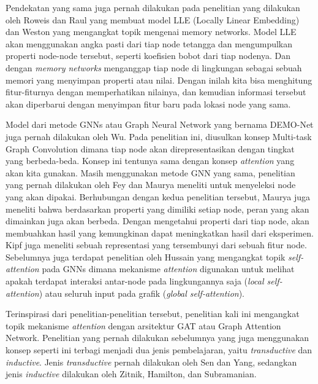 \documentclass{article}
\begin{document}
Pendekatan yang sama juga pernah dilakukan pada penelitian yang dilakukan oleh Roweis dan Raul\cite{cite12} yang membuat model LLE (Locally Linear Embedding) dan Weston\cite{cite13} yang mengangkat topik mengenai memory networks. Model LLE akan menggunakan angka pasti dari tiap node tetangga dan mengumpulkan properti node-node tersebut, seperti koefisien bobot dari tiap nodenya. Dan dengan \textit{memory networks} menganggap tiap node di lingkungan sebagai sebuah memori yang menyimpan properti atau nilai. Dengan inilah kita bisa menghitung fitur-fiturnya dengan memperhatikan nilainya, dan kemudian informasi tersebut akan diperbarui dengan menyimpan fitur baru pada lokasi node yang sama.

Model dari metode GNNs atau Graph Neural Network yang bernama DEMO-Net juga pernah dilakukan oleh Wu\cite{cite14}. Pada penelitian ini, diusulkan konsep Multi-task Graph Convolution dimana tiap node akan direpresentasikan dengan tingkat yang berbeda-beda. Konsep ini tentunya sama dengan konsep \textit{attention} yang akan kita gunakan. Masih menggunakan metode GNN yang sama, penelitian yang pernah dilakukan oleh Fey\cite{cite15} dan Maurya\cite{cite16} meneliti untuk menyeleksi node yang akan dipakai. Berhubungan dengan kedua penelitian tersebut, Maurya\cite{cite17} juga meneliti bahwa berdasarkan properti yang dimiliki setiap node, peran yang akan dimainkan juga akan berbeda. Dengan mengetahui properti dari tiap node, akan membuahkan hasil yang kemungkinan dapat meningkatkan hasil dari eksperimen. Kipf\cite{cite18} juga meneliti sebuah representasi yang tersembunyi dari sebuah fitur node. Sebelumnya juga terdapat penelitian oleh Hussain\cite{cite19} yang mengangkat topik \textit{self-attention} pada GNNs dimana mekanisme \textit{attention} digunakan untuk melihat apakah terdapat interaksi antar-node pada lingkungannya saja (\textit{local self-attention}) atau seluruh input pada grafik (\textit{global self-attention}).

Terinspirasi dari penelitian-penelitian tersebut, penelitian kali ini mengangkat topik mekanisme \textit{attention} dengan arsitektur GAT atau Graph Attention Network. Penelitian yang pernah dilakukan sebelumnya yang juga menggunakan konsep seperti ini terbagi menjadi dua jenis pembelajaran, yaitu \textit{transductive} dan \textit{inductive}. Jenis \textit{transductive} pernah dilakukan oleh Sen\cite{cite20} dan Yang\cite{cite21}, sedangkan jenis \textit{inductive} dilakukan oleh Zitnik\cite{cite22}, Hamilton\cite{cite6}, dan  Subramanian\cite{cite23}.
\end{document}
